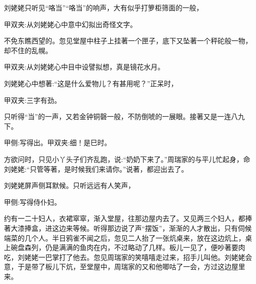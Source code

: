 \begin{parag}
    刘姥姥只听见“咯当”“咯当”的响声，大有似乎打箩柜筛面的一般，\begin{note}甲双夹:从刘姥姥心中意中幻拟出奇怪文字。\end{note}不免东瞧西望的。忽见堂屋中柱子上挂著一个匣子，底下又坠著一个秤砣般一物，却不住的乱幌。\begin{note}甲双夹:从刘姥姥心中目中设譬拟想，真是镜花水月。\end{note}刘姥姥心中想著:“这是什么爱物儿？有甚用呢？”正呆时，\begin{note}甲双夹:三字有劲。\end{note}只听得“当”的一声，又若金钟铜磬一般，不防倒唬的一展眼。接著又是一连八九下。\begin{note}甲侧:写得出。甲双夹:细！是巳时。\end{note}方欲问时，只见小丫头子们齐乱跑，说:“奶奶下来了。”周瑞家的与平儿忙起身，命刘姥姥:“只管等著，是时候我们来请你。”说著，都迎出去了。
\end{parag}


\begin{parag}
    刘姥姥屏声侧耳默候。只听远远有人笑声，\begin{note}甲侧:写得侍仆妇。\end{note}约有一二十妇人，衣裙窣窣，渐入堂屋，往那边屋内去了。又见两三个妇人，都捧著大漆捧盒，进这边来等候。听得那边说了声“摆饭”，渐渐的人才散出，只有伺候端菜的几个人。半日鸦雀不闻之后，忽见二人抬了一张炕桌来，放在这边炕上，桌上碗盘森列，仍是满满的鱼肉在内，不过略动了几样。板儿一见了，便吵著要肉吃，刘姥姥一巴掌打了他去。忽见周瑞家的笑嘻嘻走过来，招手儿叫他。刘姥姥会意，于是带了板儿下炕，至堂屋中，周瑞家的又和他唧咕了一会，方过这边屋里来。
\end{parag}


